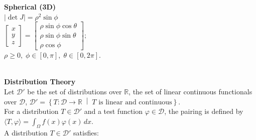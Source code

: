 \documentclass[8pt]{article}
\begin{document}
\begin{minipage}[t]{0.37\textwidth}
	\centering
	\textbf{Spherical (3D)} \\[4pt]
	\(|\det J| = \rho^2\sin\phi\) \\[4pt]
	\(\displaystyle
	\begin{bmatrix}
		x \\[4pt]
		y \\[4pt]
		z
	\end{bmatrix}
	=
	\begin{bmatrix}
		\rho\sin\phi\cos\theta \\[4pt]
		\rho\sin\phi\sin\theta \\[4pt]
		\rho\cos\phi
	\end{bmatrix};
	\) \\[4pt]
	\( \rho \geq 0, \; \phi \in [0, \pi], \; \theta \in [0, 2\pi] \).
\end{minipage}\\
\noindent \textbf{Distribution Theory} \\
Let $\mathcal{D}'$ be the set of distributions over $\mathbb{R}$, the set of linear continuous functionals over $\mathcal{D}$,
$
	\mathcal{D}' = \left\{ T \colon \mathcal{D} \to \mathbb{R} \;\middle|\; T \text{ is linear and continuous} \right\}.
$\\
For a distribution $T \in \mathcal{D}'$ and a test function $\varphi \in \mathcal{D}$, the pairing is defined by
$
	\langle T, \varphi \rangle = \int_{\Omega} f(x) \varphi(x) \, dx.
$
\\
A distribution $T \in \mathcal{D}'$ satisfies: \vspace{-13px}\hspace{170px}
\\ \vspace{-5px}
\end{document}
